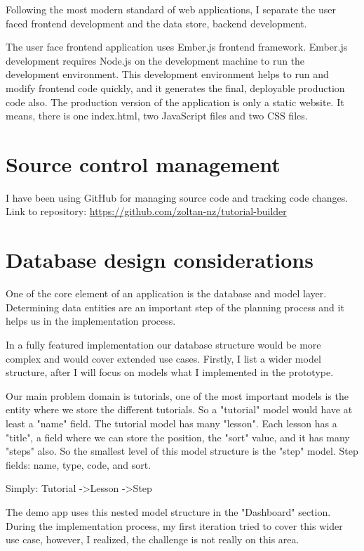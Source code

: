 \documentclass[12pt, a4paper, oneside, openright, medskipamount]{report}
\begin{document}
Following the most modern standard of web applications, I separate the user faced frontend development and the data store, backend development.

The user face frontend application uses Ember.js frontend framework. Ember.js development requires Node.js on the development machine to run the development environment. This development environment helps to run and modify frontend code quickly, and it generates the final, deployable production code also. The production version of the application is only a static website. It means, there is one index.html, two JavaScript files and two CSS files.

\section{Source control management}

I have been using GitHub for managing source code and tracking code changes. Link to repository: \url{https://github.com/zoltan-nz/tutorial-builder}

\section{Database design considerations}

One of the core element of an application is the database and model layer. Determining data entities are an important step of the planning process and it helps us in the implementation process.

In a fully featured implementation our database structure would be more complex and would cover extended use cases. Firstly, I list a wider model structure, after I will focus on models what I implemented in the prototype.

Our main problem domain is tutorials, one of the most important models is the entity where we store the different tutorials. So a "tutorial" model would have at least a "name" field. The tutorial model has many "lesson". Each lesson has a "title", a field where we can store the position, the "sort" value, and it has many "steps" also. So the smallest level of this model structure is the "step" model. Step fields: name, type, code, and sort.

Simply: Tutorial -\textgreater Lesson -\textgreater Step

The demo app uses this nested model structure in the "Dashboard" section. During the implementation process, my first iteration tried to cover this wider use case, however, I realized, the challenge is not really on this area.
\end{document}
